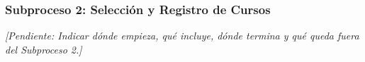 \subsubsection{Subproceso 2: Selección y Registro de Cursos}

\textit{[Pendiente: Indicar dónde empieza, qué incluye, dónde termina y qué queda fuera del Subproceso 2.]}

